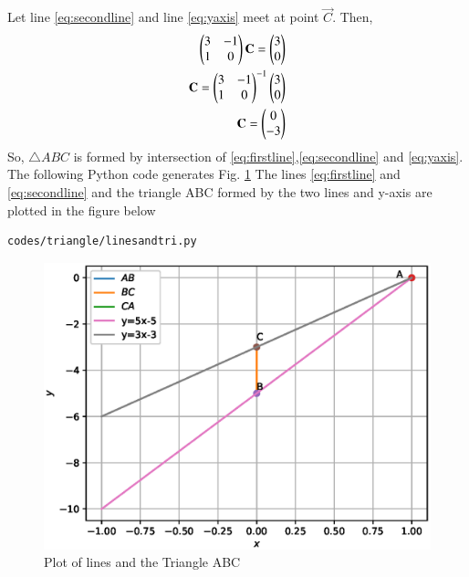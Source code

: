 \begin{enumerate}[label=\thesection.\arabic*.,ref=\thesection.\theenumi]
Let line \ref{eq:secondline} and  line \ref{eq:yaxis} meet at point $\vec{C}$. Then, 
\begin{align}
\begin{pmatrix}3&-1\\1&0\end{pmatrix}\mathbf{C} =\begin{pmatrix}3\\0\end{pmatrix}
\\
\mathbf{C}={\begin{pmatrix}3&-1\\1&0\end{pmatrix}}^{-1}\begin{pmatrix}3\\0\end{pmatrix}
\\
\mathbf{C}=\begin{pmatrix}0\\-3\end{pmatrix}
\end{align}
So, $\triangle ABC$ is formed by intersection of \ref{eq:firstline},\ref{eq:secondline} and \ref{eq:yaxis}. The  following Python code generates Fig. \ref{fig:tri_py}
%
The lines \ref{eq:firstline} and \ref{eq:secondline} and the triangle ABC formed by the two lines and y-axis are plotted in the figure below
\begin{lstlisting}
codes/triangle/linesandtri.py
\end{lstlisting}
\begin{figure}[!ht]
\centering
\includegraphics[width=\columnwidth]{./codes/triangle/pyfigs/triangle.eps}
\caption{Plot of lines and the Triangle ABC }
\label{fig:tri_py}
\end{figure}

\end{enumerate}
